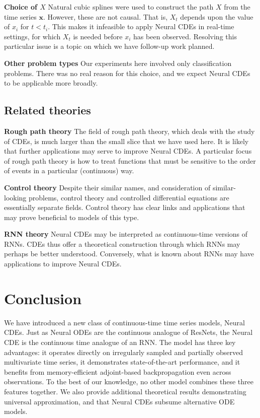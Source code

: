 \documentclass{article}
\theoremstyle{plain}
\theoremstyle{definition}
\newcommand{\boldheading}[1]{

\textbf{#1}\quad}
\begin{document}
	\boldheading{Choice of $X$} Natural cubic splines were used to construct the path $X$ from the time series $\mathbf{x}$. However, these are not causal. That is, $X_t$ depends upon the value of $x_i$ for $t < t_i$. This makes it infeasible to apply Neural CDEs in real-time settings, for which $X_t$ is needed before $x_i$ has been observed. Resolving this particular issue is a topic on which we have follow-up work planned.
	
	\boldheading{Other problem types}
	Our experiments here involved only classification problems. There was no real reason for this choice, and we expect Neural CDEs to be applicable more broadly.
	
	\subsection{Related theories}	
	\boldheading{Rough path theory}
	The field of rough path theory, which deals with the study of CDEs, is much larger than the small slice that we have used here. It is likely that further applications may serve to improve Neural CDEs. A particular focus of rough path theory is how to treat functions that must be sensitive to the order of events in a particular (continuous) way.
	
	\boldheading{Control theory}
	Despite their similar names, and consideration of similar-looking problems, control theory and controlled differential equations are essentially separate fields. Control theory has clear links and applications that may prove beneficial to models of this type.
	
	\boldheading{RNN theory}
	Neural CDEs may be interpreted as continuous-time versions of RNNs. CDEs thus offer a theoretical construction through which RNNs may perhaps be better understood. Conversely, what is known about RNNs may have applications to improve Neural CDEs.
	
	\section{Conclusion}
	We have introduced a new class of continuous-time time series models, Neural CDEs. Just as Neural ODEs are the continuous analogue of ResNets, the Neural CDE is the continuous time analogue of an RNN. The model has three key advantages: it operates directly on irregularly sampled and partially observed multivariate time series, it demonstrates state-of-the-art performance, and it benefits from memory-efficient adjoint-based backpropagation even across observations. To the best of our knowledge, no other model combines these three features together. We also provide additional theoretical results demonstrating universal approximation, and that Neural CDEs subsume alternative ODE models.
	
\end{document}
